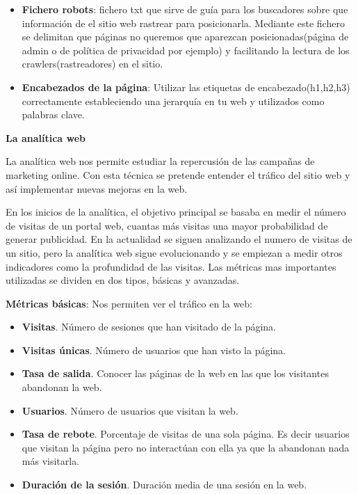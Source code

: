 \begin{itemize}
\item \textbf{Fichero robots}: fichero txt que sirve de guía para los buscadores sobre que información de el sitio web rastrear para posicionarla. Mediante este fichero se delimitan que páginas no queremos que aparezcan posicionadas(página de admin o de política de privacidad por ejemplo) y facilitando la lectura de los crawlers(rastreadores) en el sitio.

\item \textbf{Encabezados de la página}: Utilizar las etiquetas de encabezado(h1,h2,h3) correctamente estableciendo una jerarquía en tu web y utilizados como palabras clave.  


\end{itemize}

\vspace{5 mm}

\textbf{La analítica web}

\vspace{5 mm}

La analítica web nos permite estudiar la repercusión de las campañas de marketing online. Con esta técnica se pretende entender el tráfico del sitio web y así implementar nuevas mejoras en la web.

\vspace{5 mm}

En los inicios de la analítica, el objetivo principal se basaba en medir el número de visitas de un portal web, cuantas más visitas una mayor probabilidad de generar publicidad. En la actualidad se siguen analizando el numero de visitas de un sitio, pero la analítica web sigue evolucionando y se empiezan a medir otros indicadores como la profundidad de las visitas. Las métricas mas importantes utilizadas se dividen en dos tipos, básicas y avanzadas.


\textbf{Métricas básicas}: Nos permiten ver el tráfico en la web: 

\begin{itemize}

\item \textbf{Visitas}. Número de sesiones que han visitado de la página.

\item \textbf{Visitas únicas}. Número de usuarios que han visto la página.

\item \textbf{Tasa de salida}. Conocer las páginas de la web en las que los visitantes abandonan la web.

\item \textbf{Usuarios}. Número de usuarios que visitan la web. 

\item \textbf{Tasa de rebote}. Porcentaje de visitas de una sola página. Es decir usuarios que visitan la página pero no interactúan con ella ya que la abandonan nada más visitarla.

\item \textbf{Duración de la sesión}. Duración media de una sesión en la web.

\end{itemize}

